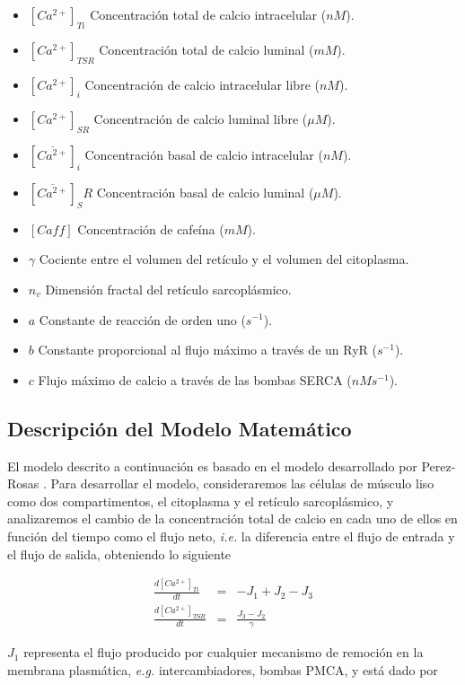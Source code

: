 \documentclass[draft]{article}
\newcommand{\Cai}{[Ca^{2+}]_{i}}
\newcommand{\Cal}{[Ca^{2+}]_{SR}}
\newcommand{\ie}{\textit{i.e.} }
\newcommand{\eg}{\textit{e.g.} }
\begin{document}
\begin{itemize}
	\item $[Ca^{2+}]_{Ti}$ Concentración total de calcio intracelular ($nM$).
	\item $[Ca^{2+}]_{TSR}$ Concentración total de calcio luminal ($mM$).
	\item $\Cai$ Concentración de calcio intracelular libre ($nM$).
	\item $\Cal$ Concentración de calcio luminal libre ($\mu M$).
	\item $[\overline{Ca^{2+}}]_i$ Concentración basal de calcio intracelular ($nM$).
	\item $[\overline{Ca^{2+}}]_SR$ Concentración basal de calcio luminal ($\mu M$).
	\item $[Caff]$ Concentración de cafeína ($mM$).
	\item $\gamma$ Cociente entre el volumen del retículo y el volumen del citoplasma.
	\item $n_v$ Dimensión fractal del retículo sarcoplásmico.
	\item $a$ Constante de reacción de orden uno ($s^{-1}$).
	\item $b$ Constante proporcional al flujo máximo a través de un RyR ($s^{-1}$).
	\item $c$ Flujo máximo de calcio a través de las bombas SERCA ($nMs^{-1}$).
	
	
\end{itemize}

\subsection{Descripción del Modelo Matemático}

El modelo descrito a continuación es basado en el modelo desarrollado por Perez-Rosas \cite{Perez-Rosas2016}. Para desarrollar el modelo, consideraremos las células de músculo liso como dos compartimentos, el citoplasma y el retículo sarcoplásmico, y analizaremos el cambio de la concentración total de calcio en cada uno de ellos en función del tiempo como el flujo neto, \ie la diferencia entre el flujo de entrada y el flujo de salida, obteniendo lo siguiente

\begin{eqnarray}
\frac{d[Ca^{2+}]_{Ti}}{dt} & = & -J_{1}+J_{2}-J_{3}  \nonumber \\
\frac{d[Ca^{2+}]_{TSR}}{dt} & = & \frac{J_{3}-J_{2}}{\gamma}
\end{eqnarray}

$J_{1}$ representa el flujo producido por cualquier mecanismo de remoción en la membrana plasmática, \eg intercambiadores, bombas PMCA, y está dado por
\end{document}
